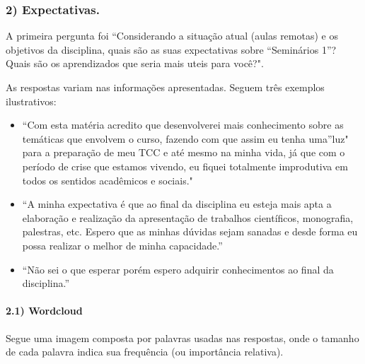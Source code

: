 \documentclass[
]{article}
\begin{document}
\hypertarget{expectativas.}{%
\subsubsection{2) Expectativas.}\label{expectativas.}}

A primeira pergunta foi ``Considerando a situação atual (aulas remotas)
e os objetivos da disciplina, quais são as suas expectativas sobre
``Seminários 1''? Quais são os aprendizados que seria mais uteis para
você?".

As respostas variam nas informações apresentadas. Seguem três exemplos
ilustrativos:

\begin{itemize}
\item
  ``Com esta matéria acredito que desenvolverei mais conhecimento sobre
  as temáticas que envolvem o curso, fazendo com que assim eu tenha
  uma''luz" para a preparação de meu TCC e até mesmo na minha vida, já
  que com o período de crise que estamos vivendo, eu fiquei totalmente
  improdutiva em todos os sentidos acadêmicos e sociais."
\item
  ``A minha expectativa é que ao final da disciplina eu esteja mais apta
  a elaboração e realização da apresentação de trabalhos científicos,
  monografia, palestras, etc. Espero que as minhas dúvidas sejam sanadas
  e desde forma eu possa realizar o melhor de minha capacidade.''
\item
  ``Não sei o que esperar porém espero adquirir conhecimentos ao final
  da disciplina.''
\end{itemize}

\hypertarget{wordcloud}{%
\paragraph{2.1) Wordcloud}\label{wordcloud}}

Segue uma imagem composta por palavras usadas nas respostas, onde o
tamanho de cada palavra indica sua frequência (ou importância relativa).
\end{document}
